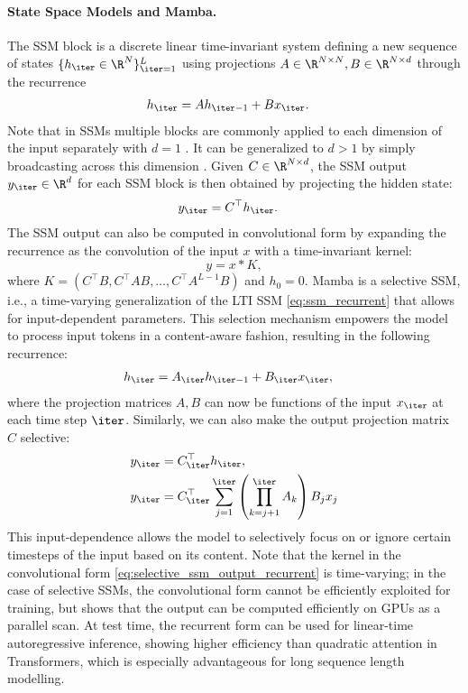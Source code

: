 \paragraph{State Space Models and Mamba.}
The SSM block is a discrete linear time-invariant system defining a new sequence of states $\{h_\iter \in \R^N\}_{\iter=1}^L$ using projections $A \in \R^{N \times N}, B \in \R^{N \times d}$ through the recurrence
\begin{align}
h_\iter &= A h_{\iter-1} + B x_\iter.
\label{eq:ssm_recurrent}
\end{align}
Note that in SSMs multiple blocks are commonly applied to each dimension of the input separately with $d=1$ \citep{mamba}.
It can be generalized to $d>1$ by simply broadcasting across this dimension \citep{mamba2}.
Given $C \in \R^{N \times d}$, the SSM output $y_\iter \in \R^d$ for each SSM block is then obtained by projecting the hidden state:
\begin{align}
y_{\iter} &= C^\top h_{\iter}.
\label{eq:ssm_output}
\end{align}
The SSM output can also be computed in convolutional form by expanding the recurrence as 
the convolution of the input $x$ with a time-invariant kernel:
\begin{equation*}
y = x\ast K,
\end{equation*}
where $K = (C^\top B, C^\top A B, \dots, C^\top A^{L-1} B)$ and $h_0=0$.
Mamba \citep{mamba} is a selective SSM, i.e., a time-varying generalization of the LTI SSM \eqref{eq:ssm_recurrent} that allows for input-dependent parameters. 
This selection mechanism empowers the model to process input tokens in a content-aware fashion, resulting in the following recurrence:
\begin{align}
h_{\iter} &= A_\iter h_{\iter-1} + B_\iter x_{\iter},
\label{eq:selective_ssm_recurrent}
\end{align}
where the projection matrices $A,B$ can now be functions of the input $x_\iter$ at each time step $\iter$. Similarly, we can also make the output projection matrix $C$ selective:
\begin{align}
y_\iter &= C^\top_\iter h_{\iter}, \label{eq:selective_ssm_output} \\
y_\iter &= C^\top_\iter \sum_{j=1}^\iter \left( \prod_{k=j+1}^\iter A_k \right) B_j x_j \label{eq:selective_ssm_output_recurrent}
\end{align}
This input-dependence allows the model to selectively focus on or ignore certain timesteps of the input based on its content.
Note that the kernel in the convolutional form \eqref{eq:selective_ssm_output_recurrent} is time-varying; in the case of selective SSMs, the convolutional form cannot be efficiently exploited for training, but \citep{mamba} shows that the output can be computed efficiently on GPUs as a parallel scan.
At test time, the recurrent form can be used for linear-time autoregressive inference, showing higher efficiency than quadratic attention in Transformers, which is especially advantageous for long sequence length modelling.

